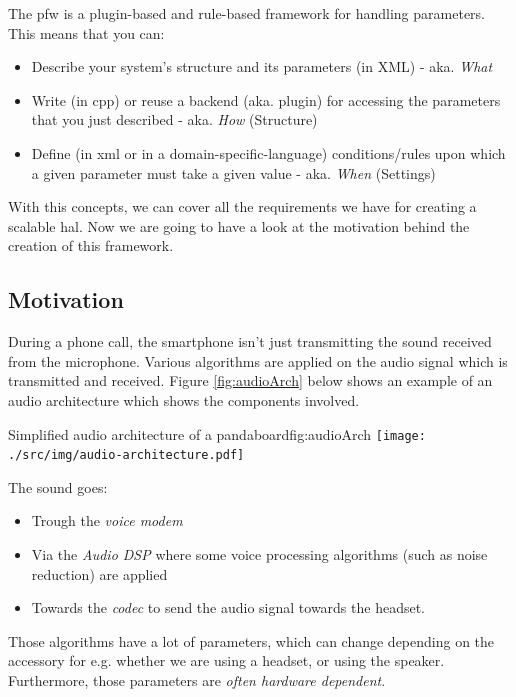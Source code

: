 The \gls{pfw} is a plugin-based and rule-based framework for handling parameters. This means that you can:

\begin{itemize}
    \item Describe your system's structure and its parameters (in XML) - aka. \emph{What}
    \item Write (in \gls{cpp}) or reuse a backend (aka. plugin) for accessing the parameters that you just described - aka. \emph{How} (Structure)
    \item Define (in \gls{xml} or in a domain-specific-language) conditions/rules upon which a given parameter must take a given value - aka. \emph{When} (Settings)
\end{itemize}

With this concepts, we can cover all the requirements we have for creating a scalable \gls{hal}.
Now we are going to have a look at the motivation behind the creation of this framework.

\subsection{Motivation}
During a phone call, the smartphone isn't just transmitting the sound received from the microphone. Various algorithms are
applied on the audio signal which is transmitted and received.
Figure \ref{fig:audioArch} below shows an example of an audio architecture which shows the components involved.

\begin{figureGraphics}{Simplified audio architecture of a pandaboard}{fig:audioArch}
    \texttt{[image: ./src/img/audio-architecture.pdf]}
\end{figureGraphics}

The sound goes:
\begin{itemize}
    \item Trough the \emph{voice modem}
    \item Via the \emph{Audio DSP} where some voice processing algorithms (such as noise reduction) are applied
    \item Towards the \emph{codec} to send the audio signal towards the headset.
\end{itemize}

Those algorithms have a lot of parameters, which can change depending on the accessory for e.g. whether we are using a headset,
or using the speaker. Furthermore, those parameters are \emph{often hardware dependent}.


